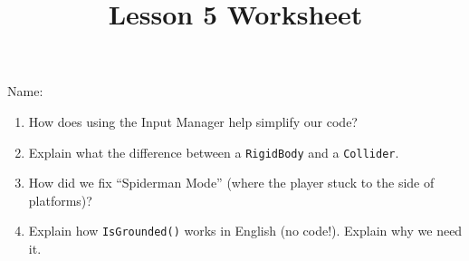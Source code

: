 \documentclass[12pt]{../rhitcsse}
\title{Lesson 5 Worksheet}
\begin{document}
\maketitle

\vspace*{0.15in}\hspace{0.25in}Name:\hrulefill\hspace{0.25in}\hspace{0.25in}

\begin{enumerate}
  \item How does using the Input Manager help simplify our code? 
  \vfill
  
  \item Explain what the difference between a \texttt{RigidBody} and a \texttt{Collider}.
  \vfill

  \item How did we fix ``Spiderman Mode'' (where the player stuck to the side of platforms)?
  \vfill

  \item Explain how \texttt{IsGrounded()} works in English (no code!). Explain why we need it.
  \vfill


\end{enumerate}
\end{document}
